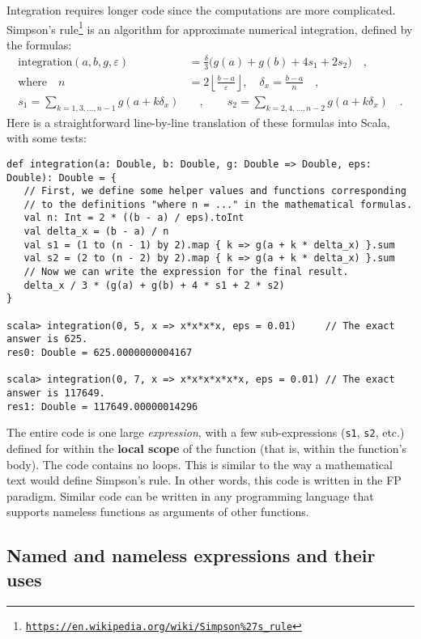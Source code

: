 Integration requires longer code since the computations are more complicated.
Simpson\textsf{'}s rule\footnote{\texttt{\href{https://en.wikipedia.org/wiki/Simpson\%27s_rule}{https://en.wikipedia.org/wiki/Simpson\%27s\_rule}}}
is an algorithm for approximate numerical integration, defined by
the formulas:
\begin{align*}
\text{integration}\left(a,b,g,\varepsilon\right) & =\frac{\delta}{3}\big(g(a)+g(b)+4s_{1}+2s_{2}\big)\quad,\\
\text{where }~~~n & =2\left\lfloor \frac{b-a}{\varepsilon}\right\rfloor ,\quad\delta_{x}=\frac{b-a}{n}\quad,\\
s_{1}=\sum_{k=1,3,...,n-1}g(a+k\delta_{x}) & \quad,\quad\quad s_{2}=\sum_{k=2,4,...,n-2}g(a+k\delta_{x})\quad.
\end{align*}
 Here is a straightforward line-by-line translation of these formulas
into Scala, with some tests:
\begin{lstlisting}
def integration(a: Double, b: Double, g: Double => Double, eps: Double): Double = {
   // First, we define some helper values and functions corresponding
   // to the definitions "where n = ..." in the mathematical formulas.
   val n: Int = 2 * ((b - a) / eps).toInt
   val delta_x = (b - a) / n
   val s1 = (1 to (n - 1) by 2).map { k => g(a + k * delta_x) }.sum
   val s2 = (2 to (n - 2) by 2).map { k => g(a + k * delta_x) }.sum
   // Now we can write the expression for the final result.
   delta_x / 3 * (g(a) + g(b) + 4 * s1 + 2 * s2)
}

scala> integration(0, 5, x => x*x*x*x, eps = 0.01)     // The exact answer is 625.
res0: Double = 625.0000000004167

scala> integration(0, 7, x => x*x*x*x*x*x, eps = 0.01) // The exact answer is 117649.
res1: Double = 117649.00000014296
\end{lstlisting}

The entire code is one large \emph{expression}, with a few sub-expressions
(\lstinline!s1!, \lstinline!s2!, etc.) defined for within the \textbf{local
scope} of the function (that is, within the function\textsf{'}s
body). The code contains no loops. This is similar to the way a mathematical
text would define Simpson\textsf{'}s rule. In other words, this code is written
in the FP paradigm. Similar code can be written in any programming
language that supports nameless functions as arguments of other functions. 

\subsection{Named and nameless expressions and their uses}

